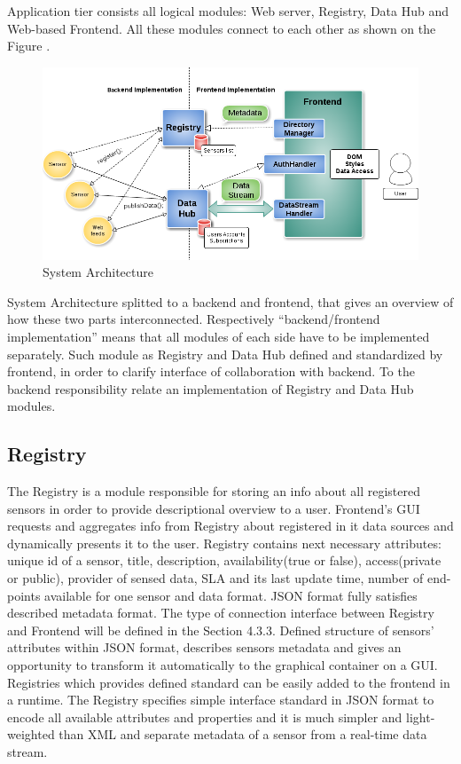   Application tier consists all logical modules: Web server, Registry, Data Hub and Web-based Frontend. All these modules connect to each other as shown on the Figure . 
    \begin{figure}[!ht]
    \centering
    \includegraphics[scale=0.6]{images/Structure.png}   
    \caption[System Architecture]{System Architecture} 
    \label{img:str}                        
    \end{figure}

    System Architecture splitted to a backend and frontend, that gives an overview of how these two parts interconnected. Respectively ``backend/frontend implementation'' means that all modules of each side have to be implemented separately. Such module as Registry and Data Hub defined and standardized by frontend, in order to clarify interface of collaboration with backend. To the backend responsibility relate an implementation of Registry and Data Hub modules.

  \subsection{Registry}
    The Registry is a module responsible for storing an info about all registered sensors in order to provide descriptional overview to a user. Frontend's GUI requests and aggregates info from Registry about registered in it data sources and dynamically presents it to the user. Registry contains next necessary attributes: unique id of a sensor, title, description, availability(true or false), access(private or public), provider of sensed data, SLA and its last update time, number of end-points available for one sensor and data format. JSON format fully satisfies described metadata format. The type of connection interface between Registry and Frontend will be defined in the Section 4.3.3. Defined structure of sensors' attributes within JSON format, describes sensors metadata and gives an opportunity to transform it automatically to the graphical container on a GUI. Registries which provides defined standard can be easily added to the frontend in a runtime. The Registry specifies simple interface standard in JSON format to encode all available attributes and properties and it is much simpler and light-weighted than XML and separate metadata of a sensor from a real-time data stream. 

